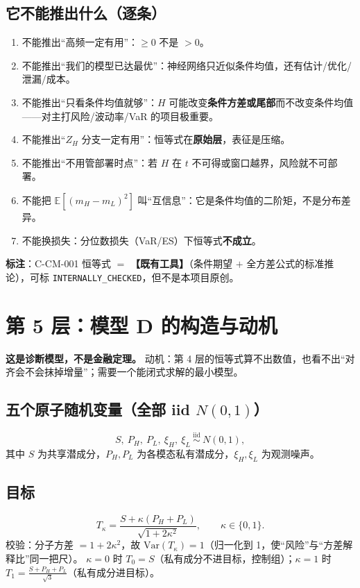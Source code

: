 \documentclass[UTF8,11pt,a4paper]{ctexart}
\newcommand{\E}{\mathbb{E}}
\newcommand{\Var}{\mathrm{Var}}
\begin{document}
\subsection{它不能推出什么（逐条）}
\begin{enumerate}
  \item 不能推出``高频一定有用''：$\ge0$ 不是 $>0$。
  \item 不能推出``我们的模型已达最优''：神经网络只近似条件均值，还有估计/优化/泄漏/成本。
  \item 不能推出``只看条件均值就够''：$H$ 可能改变\textbf{条件方差或尾部}而不改变条件均值——对主打风险/波动率/VaR 的项目极重要。
  \item 不能推出``$Z_H$ 分支一定有用''：恒等式在\textbf{原始层}，表征是压缩。
  \item 不能推出``不用管部署时点''：若 $H$ 在 $t$ 不可得或窗口越界，风险就不可部署。
  \item 不能把 $\E[(m_H-m_L)^2]$ 叫``互信息''：它是条件均值的二阶矩，不是分布差异。
  \item 不能换损失：分位数损失（VaR/ES）下恒等式\textbf{不成立}。
\end{enumerate}
\textbf{标注}：C-CM-001 恒等式 $=$ \textbf{【既有工具】}（条件期望 $+$ 全方差公式的标准推论），可标 \texttt{INTERNALLY\_CHECKED}，但不是本项目原创。

\section{第 5 层：模型 D 的构造与动机}

\textbf{这是诊断模型，不是金融定理。} 动机：第 4 层的恒等式算不出数值，也看不出``对齐会不会抹掉增量''；需要一个能闭式求解的最小模型。

\subsection{五个原子随机变量（全部 iid $N(0,1)$）}
\[
S,\ P_H,\ P_L,\ \xi_H,\ \xi_L\ \stackrel{\text{iid}}{\sim}\ N(0,1),
\]
其中 $S$ 为共享潜成分，$P_H,P_L$ 为各模态私有潜成分，$\xi_H,\xi_L$ 为观测噪声。

\subsection{目标}
\[
T_\kappa=\frac{S+\kappa(P_H+P_L)}{\sqrt{1+2\kappa^2}},\qquad \kappa\in\{0,1\}.
\]
校验：分子方差 $=1+2\kappa^2$，故 $\Var(T_\kappa)=1$（归一化到 1，使``风险''与``方差解释比''同一把尺）。
$\kappa=0$ 时 $T_0=S$（私有成分不进目标，控制组）；$\kappa=1$ 时 $T_1=\frac{S+P_H+P_L}{\sqrt3}$（私有成分进目标）。
\end{document}

